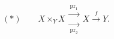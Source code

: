 \(
(\ast)\qquad
X\times_YX
\mathrel{\substack{\xrightarrow{\ \operatorname{pr}_1\ }\\[-.7ex]
                   \xrightarrow[\ \operatorname{pr}_2\ ]{}}}
X\xrightarrow{\ f\ }Y.
\)
